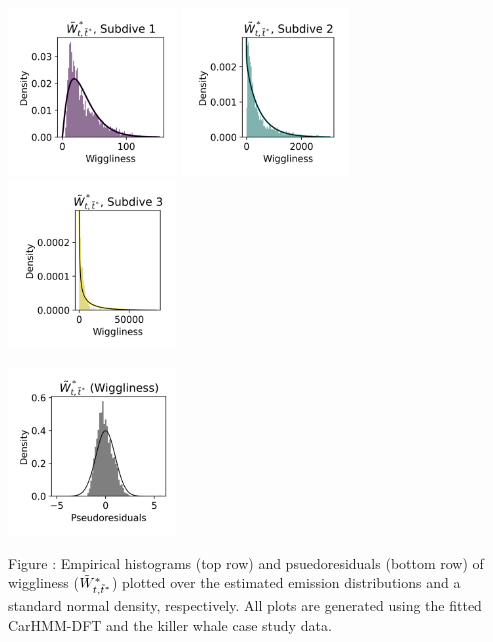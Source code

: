 \documentclass{article}
\begin{document}
        \begin{center}
        \includegraphics[width=1.75in]{../Plots/2019/20190902-182840-CATs_OB_1_0_267_CarHMM_empirical_hist_ahat_0.png}
        \includegraphics[width=1.75in]{../Plots/2019/20190902-182840-CATs_OB_1_0_267_CarHMM_empirical_hist_ahat_1.png}
        \includegraphics[width=1.75in]{../Plots/2019/20190902-182840-CATs_OB_1_0_267_CarHMM_empirical_hist_ahat_2.png}
        
        \includegraphics[width=1.75in]{../Plots/2019/20190902-182840-CATs_OB_1_0_267_CarHMM_pseudresids_ahat.png}
        \end{center}
        
        \noindent Figure : Empirical histograms (top row) and psuedoresiduals (bottom row) of wiggliness ($\tilde{W}^*_{t,\tilde t^*}$) plotted over the estimated emission distributions and a standard normal density, respectively. All plots are generated using the fitted CarHMM-DFT and the killer whale case study data.
        \addtocounter{fignum}{1}
\end{document}
